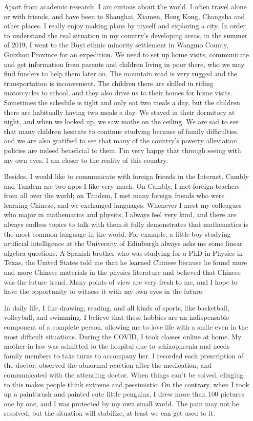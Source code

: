 \documentclass{article}
\numberwithin{equation}{section}
\begin{document}
Apart from academic research, I am curious about the world. I often travel alone or with friends, and have been to Shanghai, Xiamen, Hong Kong, Changsha and other places. I really enjoy making plans by myself and exploring a city. In order to understand the real situation in my country's developing areas, in the summer of 2019, I went to the Buyi ethnic minority settlement in Wangmo County, Guizhou Province for an expedition. We need to set up home visits, communicate and get information from parents and children living in poor there, who we may find funders to help them later on. The mountain road is very rugged and the transportation is inconvenient. The children there are skilled in riding motorcycles to school, and they also drive us to their homes for home visits. Sometimes the schedule is tight and only eat two meals a day, but the children there are habitually having two meals a day. We stayed in their dormitory at night, and when we looked up, we saw moths on the ceiling. We are sad to see that many children hesitate to continue studying because of family difficulties, and we are also gratified to see that many of the country's poverty alleviation policies are indeed beneficial to them. I’m very happy that through seeing with my own eyes, I am closer to the reality of this country.

Besides, I would like to communicate with foreign friends in the Internet. Cambly and Tandem are two apps I like very much. On Cambly, I met foreign teachers from all over the world; on Tandem, I met many foreign friends who were learning Chinese, and we exchanged languages. Whenever I meet my colleagues who major in mathematics and physics, I always feel very kind, and there are always endless topics to talk with them-it fully demonstrates that mathematics is the most common language in the world. For example, a little boy studying artificial intelligence at the University of Edinburgh always asks me some linear algebra questions. A Spanish brother who was studying for a PhD in Physics in Texas, the United States told me that he learned Chinese because he found more and more Chinese materials in the physics literature and believed that Chinese was the future trend. Many points of view are very fresh to me, and I hope to have the opportunity to witness it with my own eyes in the future.

In daily life, I like drawing, reading, and all kinds of sports, like basketball, volleyball, and swimming. I believe that these hobbies are an indispensable component of a complete person, allowing me to love life with a smile even in the most difficult situations. During the COVID, I took classes online at home. My mother-in-law was admitted to the hospital due to schizophrenia and needs family members to take turns to accompany her. I recorded each prescription of the doctor, observed the abnormal reaction after the medication, and communicated with the attending doctor. When things can’t be solved, clinging to this makes people think extreme and pessimistic. On the contrary, when I took up a paintbrush and painted cute little penguins, I drew more than 100 pictures one by one, and I was protected by my own small world. The pain may not be resolved, but the situation will stabilize, at least we can get used to it.
\end{document}
